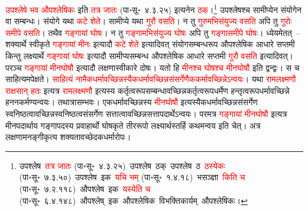 \begin{sloppypar}
\textcolor{red}{उपश्लेषे भव औपश्लेषिकः} इति \textcolor{red}{तत्र जातः} (पा॰सू॰~४.३.२५) इत्यनेन \textcolor{red}{ठक्}।\footnote{उपश्लेष~\arrow \textcolor{red}{तत्र जातः} (पा॰सू॰~४.३.२५)~\arrow उपश्लेष~ठक्~\arrow उपश्लेष~ठ~\arrow \textcolor{red}{ठस्येकः} (पा॰सू॰~७.३.५०)~\arrow उपश्लेष~इक~\arrow \textcolor{red}{यचि भम्} (पा॰सू॰~१.४.१८)~\arrow भसञ्ज्ञा~\arrow \textcolor{red}{किति च} (पा॰सू॰~७.२.११८)~\arrow औपश्लेष~इक~\arrow \textcolor{red}{यस्येति च} (पा॰सू॰~६.४.१४८)~\arrow औपश्लेष्~इक~\arrow औपश्लेषिक~\arrow विभक्ति\-कार्यम्~\arrow औपश्लेषिकः।} उपश्लेषश्च सामीप्येन संयोगेन वा सम्बन्धः। संयोगे यथा \textcolor{red}{कटे शेते}। सामीप्ये यथा \textcolor{red}{गुरौ वसति}। न तु \textcolor{red}{गुरुमभिसंयुज्य वसति} अपि तु \textcolor{red}{गुरोः समीपे वसति}। तथैव \textcolor{red}{गङ्गायां घोषः}। न तु \textcolor{red}{गङ्गामभिसंयुज्य घोषः} अपि तु \textcolor{red}{गङ्गासमीपे घोषः}। ध्येयमेतत्~– शक्यार्थे स्वीकृते \textcolor{red}{गङ्गायां मीनः} इत्यादौ \textcolor{red}{कटे शेते} इत्यादिवत् संयोग\-सम्बन्ध\-रूप औपश्लेषिक आधारे सप्तमी किन्तु लक्ष्यार्थे \textcolor{red}{गङ्गायां घोषः} इत्यादौ सामीप्य\-सम्बन्ध औपश्लेषिक आधारे सप्तमी \textcolor{red}{गुरौ वसति} इत्यादिवत्। परञ्च \textcolor{red}{गङ्गायां मीन\-घोषौ} इत्यादौ लक्षणा\-स्वीकारे दोषः। यतो हि \textcolor{red}{मीनश्च घोषश्च मीन\-घोषौ} इति द्वन्द्वः। स च साहित्यमपेक्षते। \textcolor{red}{साहित्यं नामैक\-धर्मावच्छिन्नस्यैक\-धर्मावच्छिन्न\-संसर्गेणैक\-कर्मावच्छिन्नेऽन्वयः}। यथा \textcolor{red}{राम\-लक्ष्मणौ राक्षसान् हतः} इत्यत्र \textcolor{red}{राम\-लक्ष्मणौ} इत्यस्य कर्तृत्व\-रूप\-सम्बन्धावच्छिन्न\-कर्तृत्व\-रूप\-धर्मेण हन्तृत्व\-रूप\-धर्मावच्छिन्ने हनन\-कर्मण्यन्वयः। तथात्रासम्भवः। एकधर्माव\-च्छिन्नस्य \textcolor{red}{मीन\-घोषौ} इत्यस्यैक\-धर्मावच्छिन्न\-संसर्गेण स्वनिष्ठत्वावच्छिन्न\-स्वनिष्ठत्व\-संसर्गेण सत्तात्वावच्छिन्न\-सत्ता\-पदार्थेऽन्वयः। परमत्र \textcolor{red}{गङ्गायां मीन\-घोषौ} इत्यत्र मीन\-पदार्थाय गङ्गा\-पदस्य प्रवाहार्थो घोष\-कृते तीर\-रूपो लक्ष्यार्थस्तर्हि कथमन्वय इति चेत्। अत्र लक्षणामनङ्गीकृत्य शक्यतावच्छेदक\-धर्मारोपः।

\end{sloppypar}
